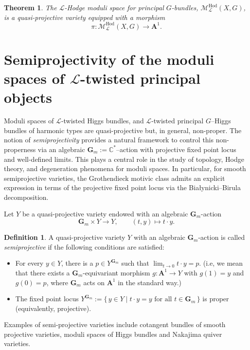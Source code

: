 \documentclass[12pt,reqno]{amsart}
\numberwithin{equation}{subsection}
\newtheorem{thm}[equation]{Theorem}
\theoremstyle{definition}
\newtheorem{defn}[equation]{Definition}
\theoremstyle{theorem}
\begin{document}
\begin{thm}
	The $\mathcal{L}$-Hodge moduli space for principal $G$-bundles,
	$\mathcal{M}_{\mathcal{L}}^{\mathrm{Hod}}(X,G)$, is a quasi-projective variety
	equipped with a morphism
	\[
	\pi:\mathcal{M}_{\mathcal{L}}^{\mathrm{Hod}}(X,G)\longrightarrow \mathbf{A}^{1}.
	\]
\end{thm}











\section{Semiprojectivity of the moduli spaces of $\mathcal{L}$-twisted principal objects}
Moduli spaces of $\mathcal{L}$-twisted Higgs bundles, and $\mathcal{L}$-twisted principal $G$--Higgs bundles of harmonic types are quasi-projective but, in general, non-proper. 
The notion of \emph{semiprojectivity} provides a natural framework to control this non-properness via an algebraic $\mathbf{G}_{m}:=\mathbb{C}^{\ast}$--action with projective fixed point locus and well-defined limits. 
This plays a central role in the study of topology, Hodge theory, and degeneration phenomena for moduli spaces. 
In particular, for smooth semiprojective varieties, the Grothendieck motivic class admits an explicit expression in terms of the projective fixed point locus via the Białynicki--Birula decomposition.

Let $Y$ be a quasi-projective variety endowed with an algebraic $\mathbf{G}_{m}$-action
\[
\mathbf{G}_{m} \times Y \longrightarrow Y, \qquad (t,y) \longmapsto t \cdot y .
\]

\begin{defn}\cite[\S\,2.1,]{Hausel-Hitchin-2022}
	A quasi-projective variety $Y$ with an algebraic $\mathbf{G}_{m}$-action is called \emph{semiprojective} if the following conditions are satisfied:
	\begin{itemize}
		\item For every $y \in Y$, there is a $p\in Y^{\mathbf{G}_{m}}$ such that $
		\lim_{t \to 0} t \cdot y = p$. (i.e, we mean that there exists a $\mathbf{G}_{m}$-equivariant morphism $g : \mathbf{A}^{1} \rightarrow Y$ with $g(1) = y$ and $g(0) = p$, where
		$\mathbf{G}_{m}$ acts on $\mathbf{A}^{1}$ in the standard way.)
		
		\item The fixed point locus $
		Y^{\mathbf{G}_{m}} := \{\, y \in Y \mid t \cdot y = y \text{ for all } t \in \mathbf{G}_{m} \,\}$ is proper (equivalently, projective).
	\end{itemize}
\end{defn}
Examples of semi-projective varieties include cotangent bundles of smooth
projective varieties, moduli spaces of Higgs bundles and Nakajima quiver
varieties.
\end{document}
